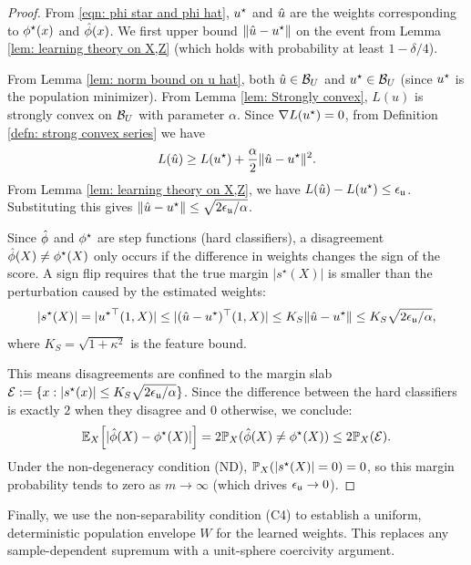 \begin{proof}
     From \eqref{eqn: phi star and phi hat}, $u^\star$ and $\hat{u}$ are the weights corresponding to $\phi^\star(x)$ and $\hat{\phi}(x)$. We first upper bound $\|\hat{u} - u^\star\|$ on the event from Lemma \ref{lem: learning theory on X,Z} (which holds with probability at least $1-\delta/4$). 
     
     From Lemma \ref{lem: norm bound on u hat}, both $\hat{u} \in \mathcal{B}_U$ and $u^\star \in \mathcal{B}_U$ (since $u^\star$ is the population minimizer). From Lemma \ref{lem: Strongly convex}, $L(u)$ is strongly convex on $\mathcal{B}_U$ with parameter $\alpha$. Since $\nabla L(u^\star)=0$, from Definition \ref{defn: strong convex series} we have
     \begin{equation}\label{eqn: strong convex for x z}
         L(\hat{u}) \geq L(u^\star) + \frac{\alpha}{2}\lVert \hat{u}-u^\star \rVert^2.
     \end{equation}
     From Lemma \ref{lem: learning theory on X,Z}, we have $L(\hat{u}) - L(u^\star) \leq \epsilon_{\mathfrak{u}}$. Substituting this gives $\|\hat{u}-u^\star\|\leq\sqrt{2\epsilon_{\mathfrak{u}}/\alpha}$.
 
     Since $\hat{\phi}$ and $\phi^\star$ are step functions (hard classifiers), a disagreement $\hat{\phi}(X) \neq \phi^\star(X)$ only occurs if the difference in weights changes the sign of the score. A sign flip requires that the true margin $|s^\star(X)|$ is smaller than the perturbation caused by the estimated weights:
     \begin{equation*}
         |s^\star(X)| = |{u^\star}^\top (1, X)| \le |(\hat{u} - u^\star)^\top (1, X)| \le K_S \|\hat{u} - u^\star\| \le K_S\sqrt{2\epsilon_{\mathfrak{u}}/\alpha},
     \end{equation*}
     where $K_S = \sqrt{1+\kappa^2}$ is the feature bound.
     
     This means disagreements are confined to the margin slab $\mathcal{E} := \{x : |s^\star(x)| \le K_S \sqrt{2\epsilon_{\mathfrak{u}}/\alpha}\}$. Since the difference between the hard classifiers is exactly $2$ when they disagree and $0$ otherwise, we conclude:
     \begin{equation*}
        \mathbb{E}_X\Big[|\hat{\phi}(X)-\phi^\star(X)|\Big] = 2 \mathbb{P}_X(\hat{\phi}(X) \neq \phi^\star(X)) \le 2\mathbb{P}_X(\mathcal{E}).
     \end{equation*}
     Under the non-degeneracy condition (ND), $\mathbb{P}_X(|s^\star(X)| = 0) = 0$, so this margin probability tends to zero as $m \to \infty$ (which drives $\epsilon_{\mathfrak{u}} \to 0$).
 \end{proof}


Finally, we use the non-separability condition (C4) to establish a uniform, deterministic population envelope $W$ for the learned weights. This replaces any sample-dependent supremum with a unit-sphere coercivity argument.

